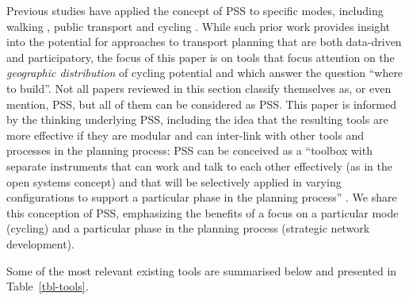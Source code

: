 \documentclass[
  super,
  preprint,
  3p]{elsarticle}
\begin{document}
Previous studies have applied the concept of PSS to specific modes,
including walking \citep{bencekri2024}, public transport
\citep{barmentlo2012} and cycling \citep{bencekri2023}. While such prior
work provides insight into the potential for approaches to transport
planning that are both data-driven and participatory, the focus of this
paper is on tools that focus attention on the \emph{geographic
distribution} of cycling potential and which answer the question ``where
to build''. Not all papers reviewed in this section classify themselves
as, or even mention, PSS, but all of them can be considered as PSS. This
paper is informed by the thinking underlying PSS, including the idea
that the resulting tools are more effective if they are modular and can
inter-link with other tools and processes in the planning process: PSS
can be conceived as a ``toolbox with separate instruments that can work
and talk to each other effectively (as in the open systems concept) and
that will be selectively applied in varying configurations to support a
particular phase in the planning process'' \citep{geertman2002}. We
share this conception of PSS, emphasizing the benefits of a focus on a
particular mode (cycling) and a particular phase in the planning process
(strategic network development).

Some of the most relevant existing tools are summarised below and
presented in Table~\ref{tbl-tools}.
\end{document}
